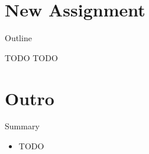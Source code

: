 \section{New Assignment}

\begin{frame}{Outline}
  \tableofcontents[current]
\end{frame}

\begin{frame}{TODO}
  TODO
\end{frame}


\section*{Outro}

\begin{frame}{Summary}
  \begin{itemize}
  \item TODO
  \end{itemize}
\end{frame}



